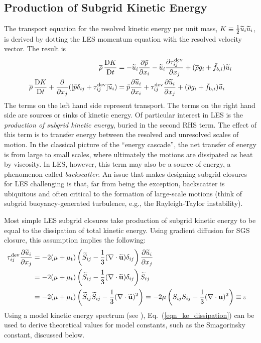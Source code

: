 \subsection{Production of Subgrid Kinetic Energy}

The transport equation for the resolved kinetic energy per unit mass, $K\equiv \mbox{$\frac{1}{2}$} \widetilde{u}_i\widetilde{u}_i$, is derived by dotting the LES momentum equation with the resolved velocity vector.  The result is
\begin{align}
\label{eqn_LES_KE}
\overline{\rho} \,\frac{\mathrm{D} K}{\mathrm{D} t} &= -\widetilde{u}_i\frac{\partial \bar{p}}{\partial x_i} - \widetilde{u}_i\frac{\partial \tau_{ij}^{\rm dev}}{\partial x_j} + (\overline{\rho} g_i + \bar{f}_{b,i}) \widetilde{u}_i \notag \\
\overline{\rho} \,\frac{\mathrm{D} K}{\mathrm{D} t} + \frac{\partial}{\partial x_j} ([\bar{p}\delta_{ij} + \tau_{ij}^{\rm dev}]\widetilde{u}_i) &=  \bar{p} \frac{\partial \widetilde{u}_i}{\partial x_i} + \tau_{ij}^{\rm dev}\frac{\partial \widetilde{u}_i}{\partial x_j} + (\overline{\rho} g_i + \bar{f}_{{\rm b},i}) \widetilde{u}_i
\end{align}
The terms on the left hand side represent transport.  The terms on the right hand side are sources or sinks of kinetic energy.  Of particular interest in LES is the \emph{production of subgrid kinetic energy}, buried in the second RHS term.  The effect of this term is to transfer energy between the resolved and unresolved scales of motion.  In the classical picture of the ``energy cascade'', the net transfer of energy is from large to small scales, where ultimately the motions are dissipated as heat by viscosity.  In LES, however, this term may also be a source of energy, a phenomenon called \emph{backscatter}.  An issue that makes designing subgrid closures for LES challenging is that, far from being the exception, backscatter is ubiquitous and often critical to the formation of large-scale motions (think of subgrid buoyancy-generated turbulence, e.g., the Rayleigh-Taylor instability).

Most simple LES subgrid closures take production of subgrid kinetic energy to be equal to the dissipation of total kinetic energy.  Using gradient diffusion for SGS closure, this assumption implies the following:
\begin{align}
\label{eqn_ke_dissipation}
\tau_{ij}^{\rm dev}\frac{\partial \widetilde{u}_i}{\partial x_j} &= - 2 (\mu + \mu_{\rm t}) \left(\widetilde{S}_{ij} - \frac{1}{3}(\nabla\cdot \widetilde{\mathbf{u}}) \delta_{ij} \right) \frac{\partial \widetilde{u}_i}{\partial x_j} && \notag\\
&= - 2 (\mu + \mu_{\rm t}) \left(\widetilde{S}_{ij} - \frac{1}{3}(\nabla\cdot \widetilde{\mathbf{u}}) \delta_{ij} \right) \widetilde{S}_{ij} && \notag \\
&= - 2 (\mu + \mu_{\rm t}) \left(\widetilde{S}_{ij}\widetilde{S}_{ij} - \frac{1}{3}(\nabla\cdot \widetilde{\mathbf{u}})^2 \right) = -2\mu \left(S_{ij}S_{ij} - \frac{1}{3}(\nabla\cdot \mathbf{u})^2 \right) \equiv \varepsilon
\end{align}
Using a model kinetic energy spectrum (see \cite{Pope:2000}), Eq.~(\ref{eqn_ke_dissipation}) can be used to derive theoretical values for model constants, such as the Smagorinsky constant, discussed below.

